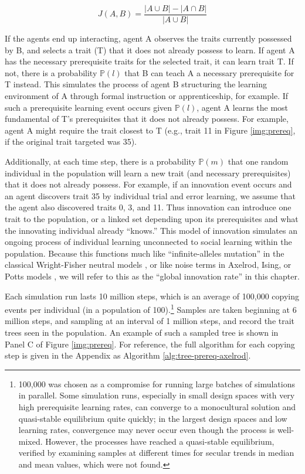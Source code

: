 \documentclass[graybox,natbib]{svmult}
\begin{document}
\begin{equation}J(A,B) = \frac{|A \cup B| - |A \cap B|}{|A \cup B|}\end{equation}

If the agents end up interacting, agent A observes the traits currently
possessed by B, and selects a trait (T) that it does not already possess
to learn. If agent A has the necessary prerequisite traits for the
selected trait, it can learn trait T. If not, there is a probability
$\mathbb{P}(l)$ that B can teach A a necessary prerequisite for T
instead. This simulates the process of agent B structuring the learning
environment of A through formal instruction or apprenticeship, for
example. If such a prerequisite learning event occurs given
$\mathbb{P}(l)$, agent A learns the most fundamental of T's
prerequisites that it does not already possess. For example, agent A
might require the trait closest to T (e.g., trait 11 in Figure
\ref{img:prereq}, if the original trait targeted was 35).

Additionally, at each time step, there is a probability $\mathbb{P}(m)$
that one random individual in the population will learn a new trait (and
necessary prerequisites) that it does not already possess. For example,
if an innovation event occurs and an agent discovers trait 35 by
individual trial and error learning, we assume that the agent also
discovered traits 0, 3, and 11. Thus innovation can introduce one trait
to the population, or a linked set depending upon its prerequisites and
what the innovating individual already ``knows.'' This model of
innovation simulates an ongoing process of individual learning
unconnected to social learning within the population. Because this
functions much like ``infinite-alleles mutation'' in the classical
Wright-Fisher neutral models \citep{Ewens2004}, or like noise terms in
Axelrod, Ising, or Potts models \citep{castellano2009statistical}, we
will refer to this as the ``global innovation rate'' in this chapter.

Each simulation run lasts 10 million steps, which is an average of
100,000 copying events per individual (in a population of
100).\footnote{100,000 was chosen as a compromise for running large
  batches of simulations in parallel. Some simulation runs, especially
  in small design spaces with very high prerequisite learning rates, can
  converge to a monocultural solution and quasi-stable equilibrium quite
  quickly; in the largest design spaces and low learning rates,
  convergence may never occur even though the process is well-mixed.
  However, the processes have reached a quasi-stable equilibrium,
  verified by examining samples at different times for secular trends in
  median and mean values, which were not found.} Samples are taken
beginning at 6 million steps, and sampling at an interval of 1 million
steps, and record the trait trees seen in the population. An example of
such a sampled tree is shown in Panel C of Figure \ref{img:prereq}. For
reference, the full algorithm for each copying step is given in the
Appendix as Algorithm \ref{alg:tree-prereq-axelrod}.
\end{document}
